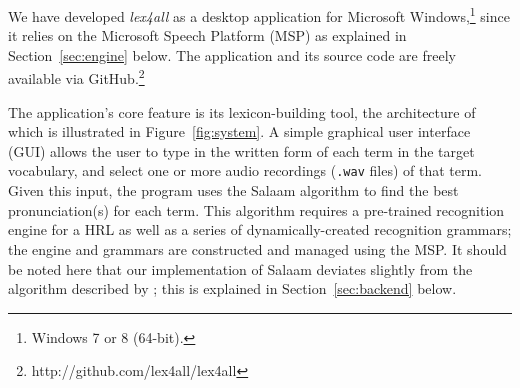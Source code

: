 \documentclass[11pt]{article}
\begin{document}
We have developed \textit{lex4all} as a desktop application for Microsoft Windows,\footnote{Windows 7 or 8 (64-bit).} since it relies on the Microsoft Speech Platform (MSP) %
as explained in Section~\ref{sec:engine} below.
The application and its source code are freely available 
via GitHub.\footnote{http://github.com/lex4all/lex4all} 


The application's core feature is its lexicon-building tool, the architecture of which is illustrated in Figure~\ref{fig:system}.
A simple graphical user interface (GUI) allows the user to type in the written form of each term in the target vocabulary, and select one or more audio recordings (\texttt{.wav} files) of that term.
Given this input, the program uses the Salaam algorithm \cite{Qiao10,Chan12} to find the best pronunciation(s) for each term. This algorithm requires a pre-trained recognition engine for a HRL 
as well as a series of dynamically-created recognition grammars; the engine and grammars are constructed and managed using the MSP.
It should be noted here that 
our implementation of Salaam deviates slightly from the algorithm described by ; this is explained in Section~\ref{sec:backend} below. 
\end{document}
